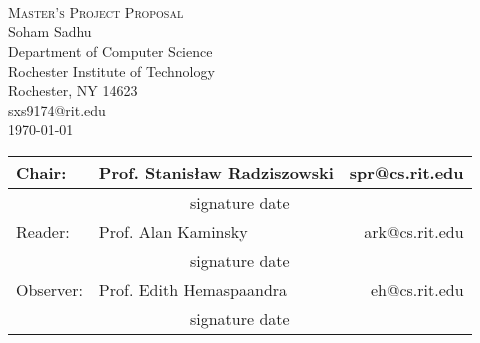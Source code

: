 \documentclass[12pt]{artikel3}                  %
\begin{document}
\begin{titlepage}
\begin{center}

\textsc{\LARGE }\\[0.2cm]
\textsc{\LARGE }\\[0.2cm]
\textsc{\LARGE }\\[1.2cm]

\textsc{\Large Master's Project Proposal}\\[1cm]

\large{Soham Sadhu}\\
\large{Department of Computer Science}\\
\large{Rochester Institute of Technology}\\
\large{Rochester, NY 14623}\\
\large{sxs9174@rit.edu}\\[0.5cm]

{\large \today}\\[1cm]

\begin{tabular}{l l r}
    Chair: & Prof. Stanis{\l}aw Radziszowski & spr@cs.rit.edu\\[1.5cm] \hline
    \multicolumn{3}{c}{signature \hspace{6cm} date}\\[1cm]
    Reader: & Prof. Alan Kaminsky & ark@cs.rit.edu\\[1.5cm] \hline
    \multicolumn{3}{c}{signature \hspace{6cm} date}\\[1cm]
    Observer: & Prof. Edith Hemaspaandra & eh@cs.rit.edu\\[1.5cm] \hline
    \multicolumn{3}{c}{signature \hspace{6cm} date}\\[1cm]
\end{tabular}


\vfill

\end{center}
\end{titlepage}
\end{document}
